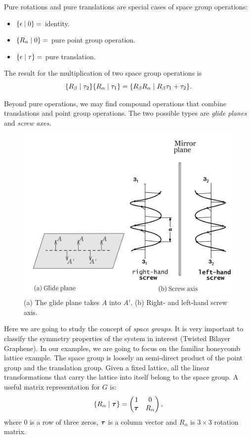 Pure rotations and pure translations are special cases of space group operations:
\begin{itemize}
\item $\{ \epsilon \mid 0 \} =$ identity.
\item $\{ R_\alpha \mid 0 \} =$ pure point group operation.
\item $\{ \epsilon \mid \tau \} =$ pure translation.
\end{itemize}

The result for the multiplication of two space group operations is
$$
\{ R_\beta \mid \tau_2 \} \{ R_\alpha \mid \tau_1 \} = \{ R_\beta R_\alpha \mid R_\beta\tau_1 + \tau_2 \}.
$$

Beyond pure operations, we may find compound operations that combine translations and point group operations. The two possible types are \textit{glide planes} and \textit{screw axes}.
\begin{figure}[H]
\centering
\includegraphics[width=0.5\linewidth]{fig/glideplane-screwaxis.png}
\caption{(a) The glide plane takes $A$ into $A'$. (b) Right- and left-hand screw axis.}
\label{fig:glideplane-screwaxis}
\end{figure}

Here we are going to study the concept of \textit{space groups}. It is very important to classify the symmetry properties of the system in interest (Twisted Bilayer Graphene). In our examples, we are going to focus on the familiar honeycomb lattice example. The space group is loosely an semi-direct product of the point group and the translation group. Given a fixed lattice, all the linear transformations that carry the lattice into itself belong to the space group. A useful matrix representation for $G$ is:
\begin{equation} \label{eq:spacegroup-rep}
\{ R_\alpha \mid {\bm{\tau}} \} =
\begin{pmatrix}
1 & 0 \\
{\bm{\tau}} & R_\alpha
\end{pmatrix},
\end{equation}
where $0$ is a row of three zeros, ${\bm{\tau}}$ is a column vector and $R_\alpha$ is $3\times 3$ rotation matrix.


